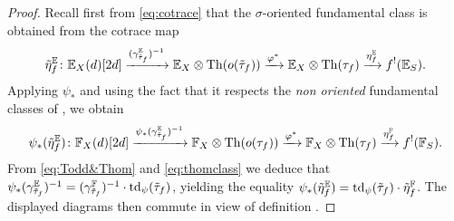 \begin{proof}
Recall first from \eqref{eq:cotrace} that the $\sigma$-oriented fundamental class is obtained from the cotrace map
\[
\tilde\eta_f^\mathbb E\colon\mathbb E_X(d)[2d] \xrightarrow{(\gamma_{\tilde \tau_f}^{\mathbb E})^{-1}} \mathbb E_X\otimes \operatorname{Th}(o(\tilde \tau_f))\xrightarrow{\varphi^*}\mathbb E_X \otimes \operatorname{Th}(\tau_f)
\xrightarrow{\eta_f^\mathbb E} f^!(\mathbb E_S).
\]
Applying $\psi_*$ and using the fact that it respects the \emph{non oriented} fundamental classes of , we obtain 
\[
\psi_*(\tilde\eta_f^\mathbb E)\colon\mathbb F_X(d)[2d] \xrightarrow{\psi_*(\gamma_{\tilde \tau_f}^{\mathbb E})^{-1}} \mathbb F_X\otimes \operatorname{Th}(o(\tau_f))\xrightarrow{\varphi^*}\mathbb F_X \otimes \operatorname{Th}(\tau_f)
\xrightarrow{\eta_f^\mathbb F} f^!(\mathbb F_S).
\]
From \eqref{eq:Todd&Thom} and \eqref{eq:thomclass} we deduce that $\psi_*(\gamma_{\tilde \tau_f}^{\mathbb E})^{-1}=(\gamma_{\tilde \tau_f}^{\mathbb F})^{-1}\cdot \operatorname{td}_{\psi}(\tilde \tau_f)$, yielding the equality $\psi_*(\tilde\eta_f^\mathbb E)=\operatorname{td}_\psi(\tilde \tau_f)\cdot\tilde\eta_f^\mathbb F$. The displayed diagrams then commute in view of definition .
\end{proof}

 
